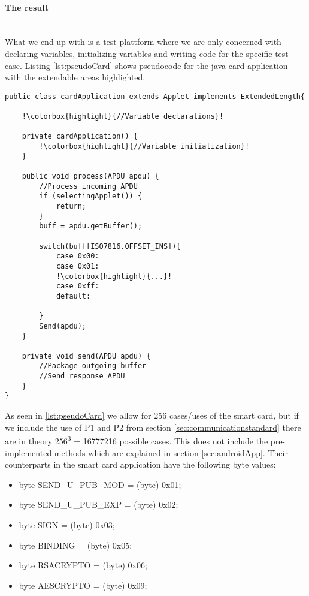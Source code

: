 \paragraph{The result}\mbox{}\\
What we end up with is a test plattform where we are only concerned with declaring variables, initializing variables and writing code for the specific test case. Listing \ref{lst:pseudoCard} shows pseudocode for the java card application with the extendable areas highlighted.


\begin{lstlisting}[caption=Pseudo code for javacard test application., label=lst:pseudoCard,escapechar=!]
public class cardApplication extends Applet implements ExtendedLength{

    !\colorbox{highlight}{//Variable declarations}!

    private cardApplication() {
    	!\colorbox{highlight}{//Variable initialization}!
    }

    public void process(APDU apdu) {
    	//Process incoming APDU
        if (selectingApplet()) {
			return;
		}
        buff = apdu.getBuffer();

    	switch(buff[ISO7816.OFFSET_INS]){
            case 0x00:
            case 0x01:
            !\colorbox{highlight}{...}!
            case 0xff:
            default:

    	}
    	Send(apdu);
    }

    private void send(APDU apdu) {
    	//Package outgoing buffer
    	//Send response APDU
    }
}
\end{lstlisting}

As seen in \ref{lst:pseudoCard} we allow for 256 cases/uses of the smart card, but if we include the use of P1 and P2 from section \ref{sec:communicationstandard} there are in theory 256\textsuperscript{3} = 16777216 possible cases. This does not include the pre-implemented methods which are explained in section \ref{sec:androidApp}. Their counterparts in the smart card application have the following byte values:

\begin{itemize}
    \item byte SEND\_U\_PUB\_MOD = (byte) 0x01;
    \item byte SEND\_U\_PUB\_EXP = (byte) 0x02;
    \item byte SIGN = (byte) 0x03;
    \item byte BINDING = (byte) 0x05;
    \item byte RSACRYPTO = (byte) 0x06;
    \item byte AESCRYPTO = (byte) 0x09;
\end{itemize}

